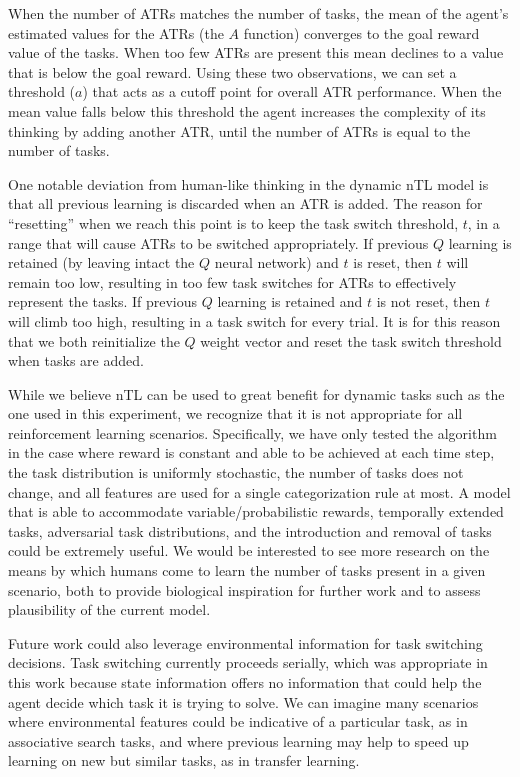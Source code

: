 \documentclass[10pt,letterpaper]{article}
\begin{document}
When the number of ATRs matches the number of tasks, the mean of the agent's estimated values for the ATRs (the $ A $ function) converges to the goal reward value of the tasks. When too few ATRs are present this mean declines to a value that is below the goal reward. Using these two observations, we can set a threshold ($a$) that acts as a cutoff point for overall ATR performance. When the mean value falls below this threshold the agent increases the complexity of its thinking by adding another ATR, until the number of ATRs is equal to the number of tasks.

One notable deviation from human-like thinking in the dynamic nTL model is that all previous learning is discarded when an ATR is added. The reason for ``resetting'' when we reach this point is to keep the task switch threshold, $t$, in a range that will cause ATRs to be switched appropriately. If previous $Q$ learning is retained (by leaving intact the $Q$ neural network) and $t$ is reset, then $t$ will remain too low, resulting in too few task switches for ATRs to effectively represent the tasks. If previous $Q$ learning is retained and $t$ is not reset, then $t$ will climb too high, resulting in a task switch for every trial. It is for this reason that we both reinitialize the $Q$ weight vector and reset the task switch threshold when tasks are added.

While we believe nTL can be used to great benefit for dynamic tasks such as the one used in this experiment, we recognize that it is not appropriate for all reinforcement learning scenarios. Specifically, we have only tested the algorithm in the case where reward is constant and able to be achieved at each time step, the task distribution is uniformly stochastic, the number of tasks does not change, and all features are used for a single categorization rule at most. A model that is able to accommodate variable/probabilistic rewards, temporally extended tasks, adversarial task distributions, and the introduction and removal of tasks could be extremely useful. We would be interested to see more research on the means by which humans come to learn the number of tasks present in a given scenario, both to provide biological inspiration for further work and to assess plausibility of the current model.

Future work could also leverage environmental information for task switching decisions. Task switching currently proceeds serially, which was appropriate in this work because state information offers no information that could help the agent decide which task it is trying to solve. We can imagine many scenarios where environmental features could be indicative of a particular task, as in associative search tasks, and where previous learning may help to speed up learning on new but similar tasks, as in transfer learning.
\end{document}
